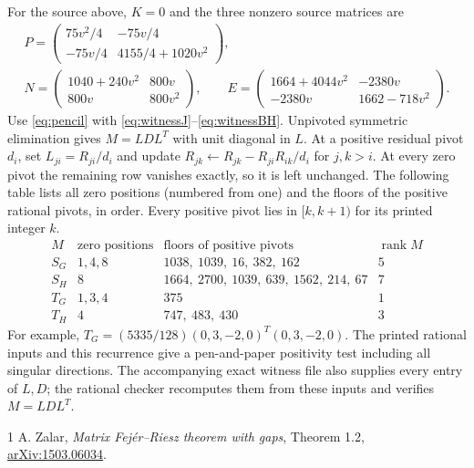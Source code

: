 \documentclass[11pt]{article}
\begin{document}
For the source above, $K=0$ and the three nonzero source matrices are
\begin{gather*}
 P=\begin{pmatrix}75v^2/4&-75v/4\\-75v/4&4155/4+1020v^2\end{pmatrix},\\
 N=\begin{pmatrix}1040+240v^2&800v\\800v&800v^2\end{pmatrix},\qquad
 E=\begin{pmatrix}1664+4044v^2&-2380v\\-2380v&1662-718v^2\end{pmatrix}.
\end{gather*}
Use \eqref{eq:pencil} with \eqref{eq:witnessJ}--\eqref{eq:witnessBH}.
Unpivoted symmetric elimination gives $M=LDL^T$ with unit diagonal in $L$.
At a positive residual pivot $d_i$, set $L_{ji}=R_{ji}/d_i$ and update
$R_{jk}\leftarrow R_{jk}-R_{ji}R_{ik}/d_i$ for $j,k>i$.
At every zero pivot the remaining row vanishes exactly, so it is left
unchanged. The following table lists all zero positions (numbered from one)
and the floors of the positive rational pivots, in order. Every positive
pivot lies in $[k,k+1)$ for its printed integer $k$.
\[
\begin{array}{c|c|l|c}
 M&\text{zero positions}&\text{floors of positive pivots}&\operatorname{rank}M\\\hline
 S_G&1,4,8&1038,\ 1039,\ 16,\ 382,\ 162&5\\
 S_H&8&1664,\ 2700,\ 1039,\ 639,\ 1562,\ 214,\ 67&7\\
 T_G&1,3,4&375&1\\
 T_H&4&747,\ 483,\ 430&3
\end{array}
\]
For example,
$T_G=(5335/128)(0,3,-2,0)^T(0,3,-2,0)$.
The printed rational inputs and this recurrence give a pen-and-paper
positivity test including all singular directions. The accompanying exact
witness file also supplies every entry of $L,D$; the rational checker
recomputes them from these inputs and verifies $M=LDL^T$.

\begin{thebibliography}{1}
 A. Zalar, \emph{Matrix Fej\'er--Riesz theorem with gaps},
Theorem 1.2, \href{https://arxiv.org/abs/1503.06034}{arXiv:1503.06034}.
\end{thebibliography}
\end{document}
